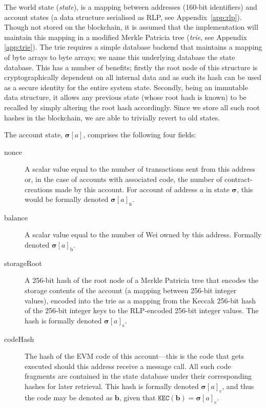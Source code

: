 \documentclass[9pt,oneside]{amsart}
\makeatletter
\newcommand{\linkdest}[1]{\Hy@raisedlink{\hypertarget{#1}{}}}
\makeatother
\begin{document}
\begin{multicols}{2}
The world state (\textit{state}), is a mapping between addresses (160-bit identifiers) and account states (a data structure serialised as RLP, see Appendix~\ref{app:rlp}). Though not stored on the blockchain, it is assumed that the implementation will maintain this mapping in a modified Merkle Patricia tree (\textit{trie}, see Appendix \ref{app:trie}). The trie requires a simple database backend that maintains a mapping of byte arrays to byte arrays; we name this underlying database the state database. This has a number of benefits; firstly the root node of this structure is cryptographically dependent on all internal data and as such its hash can be used as a secure identity for the entire system state. Secondly, being an immutable data structure, it allows any previous state (whose root hash is known) to be recalled by simply altering the root hash accordingly. Since we store all such root hashes in the blockchain, we are able to trivially revert to old states.

The account state, $\boldsymbol{\sigma}[a]$, comprises the following four fields:

\begin{description}
\item[nonce] \linkdest{account_nonce}A scalar value equal to the number of transactions sent from this address or, in the case of accounts with associated code, the number of contract-creations made by this account. For account of address $a$ in state $\boldsymbol{\sigma}$, this would be formally denoted $\boldsymbol{\sigma}[a]_{\mathrm{n}}$.
\item[balance] A scalar value equal to the number of Wei owned by this address. Formally denoted $\boldsymbol{\sigma}[a]_{\mathrm{b}}$.
\item[storageRoot] A 256-bit hash of the root node of a Merkle Patricia tree that encodes the storage contents of the account (a mapping between 256-bit integer values), encoded into the trie as a mapping from the Keccak 256-bit hash of the  256-bit integer keys to the RLP-encoded 256-bit integer values. The hash is formally denoted $\boldsymbol{\sigma}[a]_{\mathrm{s}}$.
\item[codeHash] The hash of the EVM code of this account---this is the code that gets executed should this address receive a message call. All such code fragments are contained in the state database under their corresponding hashes for later retrieval. This hash is formally denoted $\boldsymbol{\sigma}[a]_{\mathrm{c}}$, and thus the code may be denoted as $\mathbf{b}$, given that $\texttt{KEC}(\mathbf{b}) = \boldsymbol{\sigma}[a]_{\mathrm{c}}$.
\end{description}


\end{multicols}
\end{document}
